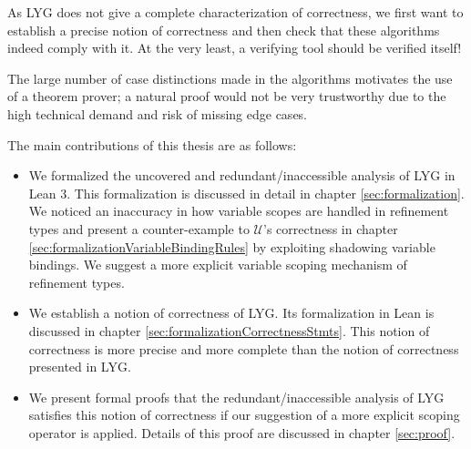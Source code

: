 As LYG does not give a complete characterization of correctness,
we first want to establish a precise notion of correctness and then check that these algorithms indeed comply with it. At the very least, a verifying tool should be verified itself!

The large number of case distinctions made in the algorithms motivates the use of a theorem prover;
a natural proof would not be very trustworthy due to the high technical demand and risk of missing edge cases.

\vspace{\baselineskip}

The main contributions of this thesis are as follows:
\begin{itemize}
\item We formalized the uncovered and redundant/inaccessible analysis of LYG in Lean 3. This formalization is discussed in detail in chapter \ref{sec:formalization}.
We noticed an inaccuracy in how variable scopes are handled in refinement types
and present a counter-example to $\mathcal{U}$'s correctness in chapter \ref{sec:formalizationVariableBindingRules} by exploiting shadowing variable bindings.
We suggest a more explicit variable scoping mechanism of refinement types.
\item We establish a notion of correctness of LYG. Its formalization in Lean is discussed in chapter \ref{sec:formalizationCorrectnessStmts}. This notion of correctness is more precise and more complete than the notion of correctness presented in LYG.
\item We present formal proofs that the redundant/inaccessible analysis of LYG satisfies
    this notion of correctness if our suggestion of a more explicit scoping operator is applied. Details of this proof are discussed in chapter \ref{sec:proof}.

\end{itemize}
